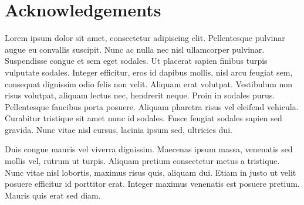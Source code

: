 \section*{Acknowledgements}

Lorem ipsum dolor sit amet, consectetur adipiscing elit. Pellentesque pulvinar augue eu convallis suscipit.
Nunc ac nulla nec nisl ullamcorper pulvinar. Suspendisse congue et sem eget sodales. Ut placerat sapien finibus turpis vulputate sodales.
Integer efficitur, eros id dapibus mollis, nisl arcu feugiat sem, consequat dignissim odio felis non velit. Aliquam erat volutpat.
Vestibulum non risus volutpat, aliquam lectus nec, hendrerit neque. Proin in sodales purus. Pellentesque faucibus porta posuere.
Aliquam pharetra risus vel eleifend vehicula. Curabitur tristique sit amet nunc id sodales. Fusce feugiat sodales sapien sed gravida.
Nunc vitae nisl cursus, lacinia ipsum sed, ultricies dui.

Duis congue mauris vel viverra dignissim. Maecenas ipsum massa, venenatis sed mollis vel, rutrum ut turpis. Aliquam pretium consectetur metus a tristique.
Nunc vitae nisl lobortis, maximus risus quis, aliquam dui. Etiam in justo ut velit posuere efficitur id porttitor erat.
Integer maximus venenatis est posuere pretium. Mauris quis erat sed diam.